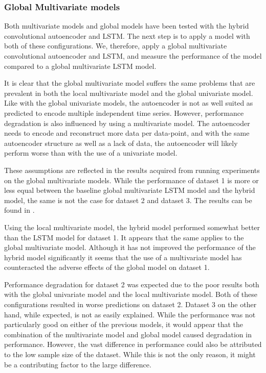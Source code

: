 \subsubsection{Global Multivariate models}


Both multivariate models and global models have been tested with the hybrid convolutional autoencoder and LSTM.
The next step is to apply a model with both of these configurations.
We, therefore, apply a global multivariate convolutional autoencoder and LSTM, and measure the performance of the model
compared to a global multivariate LSTM model.

It is clear that the global multivariate model suffers the same problems that are prevalent in both the local multivariate model
and the global univariate model.
Like with the global univariate models, the autoencoder is not as well suited as predicted to encode multiple independent time series.
However, performance degradation is also influenced by using a multivariate model.
The autoencoder needs to encode and reconstruct more data per data-point, and with the same autoencoder structure
as well as a lack of data, the autoencoder will likely perform worse than with the use of a univariate model.

These assumptions are reflected in the results acquired from running experiments on the global multivariate models.
While the performance of dataset 1 is more or less equal between the baseline global multivariate LSTM model and the hybrid model,
the same is not the case for dataset 2 and dataset 3.
The results can be found in .


Using the local multivariate model, the hybrid model performed somewhat better than the LSTM model for dataset 1.
It appears that the same applies to the global multivariate model.
Although it has not improved the performance of the hybrid model significantly
it seems that the use of a multivariate model has counteracted the adverse effects of the global model on dataset 1.

Performance degradation for dataset 2 was expected due to the poor results both with the global univariate model and the local multivariate model.
Both of these configurations resulted in worse predictions on dataset 2.
Dataset 3 on the other hand, while expected, is not as easily explained.
While the performance was not particularly good on either of the previous models, it would appear that the combination of the multivariate model and global model
caused degradation in performance.
However, the vast difference in performance could also be attributed to the low sample size of the dataset.
While this is not the only reason, it might be a contributing factor to the large difference.

